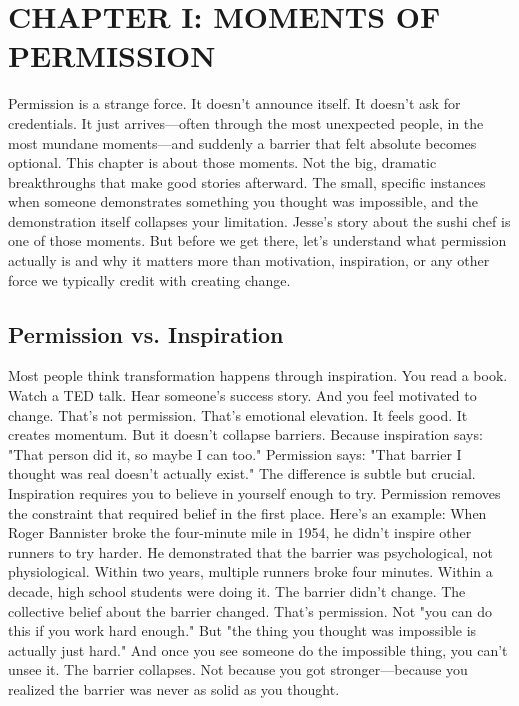 \documentclass[12pt,openany]{book}
\begin{document}
\cleardoublepage

\chapter{CHAPTER I: MOMENTS OF PERMISSION}

Permission is a strange force.
It doesn't announce itself. It doesn't ask for credentials. It just arrives—often through the most unexpected people, in the most mundane moments—and suddenly a barrier that felt absolute becomes optional.
This chapter is about those moments.
Not the big, dramatic breakthroughs that make good stories afterward. The small, specific instances when someone demonstrates something you thought was impossible, and the demonstration itself collapses your limitation.
Jesse's story about the sushi chef is one of those moments. But before we get there, let's understand what permission actually is and why it matters more than motivation, inspiration, or any other force we typically credit with creating change.

\section{Permission vs. Inspiration}

Most people think transformation happens through inspiration.
You read a book. Watch a TED talk. Hear someone's success story. And you feel motivated to change.
That's not permission. That's emotional elevation.
It feels good. It creates momentum. But it doesn't collapse barriers. Because inspiration says: "That person did it, so maybe I can too."
Permission says: "That barrier I thought was real doesn't actually exist."
The difference is subtle but crucial.
Inspiration requires you to believe in yourself enough to try. Permission removes the constraint that required belief in the first place.
Here's an example:
When Roger Bannister broke the four-minute mile in 1954, he didn't inspire other runners to try harder. He demonstrated that the barrier was psychological, not physiological. Within two years, multiple runners broke four minutes. Within a decade, high school students were doing it.
The barrier didn't change. The collective belief about the barrier changed.
That's permission. Not "you can do this if you work hard enough." But "the thing you thought was impossible is actually just hard."
And once you see someone do the impossible thing, you can't unsee it. The barrier collapses. Not because you got stronger—because you realized the barrier was never as solid as you thought.
\end{document}
